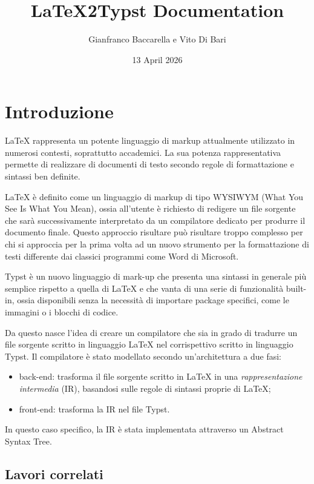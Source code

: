\documentclass{article}
\title{LaTeX2Typst Documentation}
\author{Gianfranco Baccarella e Vito Di Bari}
\date{13 April 2026}
\begin{document}
    \maketitle
    \tableofcontents

    \section{Introduzione}

    LaTeX rappresenta un potente linguaggio di markup attualmente utilizzato in numerosi contesti, soprattutto accademici.
    La sua potenza rappresentativa permette di realizzare di documenti di testo secondo regole di formattazione e sintassi ben definite.

    LaTeX è definito come un linguaggio di markup di tipo WYSIWYM (What You See Is What You Mean), ossia all'utente è richiesto di redigere un file sorgente che sarà successivamente interpretato da un compilatore dedicato per produrre il documento finale.
    Questo approccio risultare può risultare troppo complesso per chi si approccia per la prima volta ad un nuovo strumento per la formattazione di testi differente dai classici programmi come Word di Microsoft.

    Typst è un nuovo linguaggio di mark-up che presenta una sintassi in generale più semplice rispetto a quella di LaTeX e che vanta di una serie di funzionalità built-in, ossia disponibili senza la necessità di importare package specifici, come le immagini o i blocchi di codice.

    Da questo nasce l'idea di creare un compilatore che sia in grado di tradurre un file sorgente scritto in linguaggio LaTeX nel corrispettivo scritto in linguaggio Typst. Il compilatore è stato modellato secondo un'architettura a due fasi:
    \begin{itemize}
        \item back-end: trasforma il file sorgente scritto in LaTeX in una \textit{rappresentazione intermedia} (IR), basandosi sulle regole di sintassi proprie di LaTeX;
        \item front-end: trasforma la IR nel file Typst.
    \end{itemize}

    In questo caso specifico, la IR è stata implementata attraverso un Abstract Syntax Tree.

    \subsection{Lavori correlati}
\end{document}
